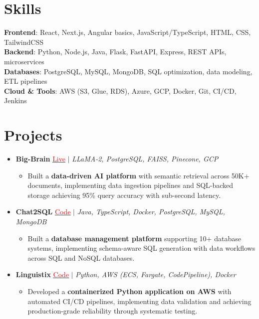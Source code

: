 \documentclass[letterpaper,10pt]{article}
\newcommand{\resumeItem}[1]{\item\small{{#1 \vspace{-2pt}}}}
\newcommand{\resumeProjectHeading}[1]{\item \small #1 \vspace{-2pt}}
\newcommand{\resumeSubHeadingListStart}{\begin{itemize}[leftmargin=0.0in, label={}]}
\newcommand{\resumeSubHeadingListEnd}{\end{itemize}}
\newcommand{\resumeProjItemListStart}{\begin{itemize}[leftmargin=0.15in,label=\textbullet,itemsep=0pt,topsep=0pt,parsep=0pt,partopsep=0pt]}
\newcommand{\resumeProjItemListEnd}{\end{itemize}\vspace{-4pt}}
\begin{document}
\section{Skills}
\begin{itemize}[leftmargin=0.15in, label={}]
\small{\item{
\textbf{Frontend}: React, Next.js, Angular basics, JavaScript/TypeScript, HTML, CSS, TailwindCSS \\
\textbf{Backend}: Python, Node.js, Java, Flask, FastAPI, Express, REST APIs, microservices \\
\textbf{Databases}: PostgreSQL, MySQL, MongoDB, SQL optimization, data modeling, ETL pipelines \\
\textbf{Cloud \& Tools}: AWS (S3, Glue, RDS), Azure, GCP, Docker, Git, CI/CD, Jenkins
}}
\end{itemize}
\vspace{-16pt}
\section{Projects}
\resumeSubHeadingListStart
\vspace{-2pt}
\resumeProjectHeading{\textbf{Big-Brain} {\href{https://big-brain-pied.vercel.app/}{\textcolor{red}{\underline{Live}}}} $|$ \emph{LLaMA-2, PostgreSQL, FAISS, Pinecone, GCP}}
\resumeProjItemListStart
\resumeItem{Built a \textbf{data-driven AI platform} with semantic retrieval across 50K+ documents, implementing data ingestion pipelines and SQL-backed storage achieving 95\% query accuracy with sub-second latency.}
\resumeProjItemListEnd
\vspace{3pt}
\resumeProjectHeading{\textbf{Chat2SQL} {\href{https://github.com/SAHAJ-BHADJA/Chat2SQL}{\textcolor{red}{\underline{Code}}}} $|$ \emph{Java, TypeScript, Docker, PostgreSQL, MySQL, MongoDB}}
\resumeProjItemListStart
\resumeItem{Built a \textbf{database management platform} supporting 10+ database systems, implementing schema-aware SQL generation with data workflows across SQL and NoSQL databases.}
\resumeProjItemListEnd
\vspace{3pt}
\resumeProjectHeading{\textbf{Linguistix} {\href{https://github.com/SAHAJ-BHADJA/Linguistix}{\textcolor{red}{\underline{Code}}}} $|$ \emph{Python, AWS (ECS, Fargate, CodePipeline), Docker}}
\resumeProjItemListStart
\resumeItem{Developed a \textbf{containerized Python application on AWS} with automated CI/CD pipelines, implementing data validation and achieving production-grade reliability through systematic testing.}
\resumeProjItemListEnd
\resumeSubHeadingListEnd
\end{document}
